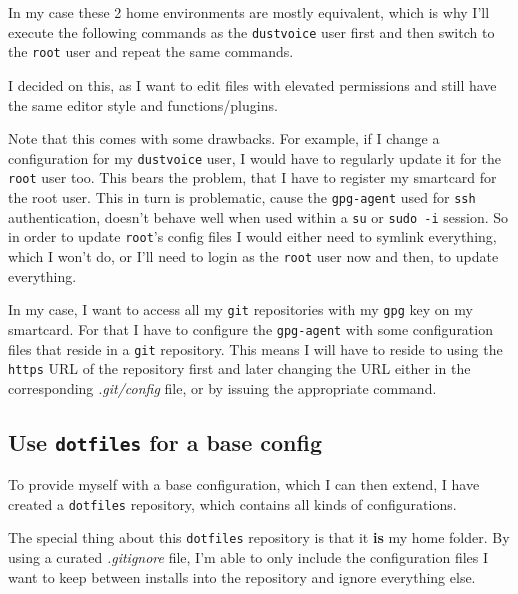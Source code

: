 \documentclass[9pt]{report}
\newenvironment{NOTE}
{\begin{tcolorbox}[colback=admonitionBG,coltitle=draculaFG,colframe=draculaBlue,colbacktitle=draculaBlue,title=NOTE]}
{\end{tcolorbox}}
\begin{document}
\begin{NOTE}
    In my case these 2 home environments are mostly equivalent, which is why I’ll execute the following commands as the \texttt{dustvoice} user first and then switch to the \texttt{root} user and repeat the same commands.


    I decided on this, as I want to edit files with elevated permissions and still have the same editor style and functions/plugins.


    Note that this comes with some drawbacks.
    For example, if I change a configuration for my \texttt{dustvoice} user, I would have to regularly update it for the \texttt{root} user too.
    This bears the problem, that I have to register my smartcard for the root user.
    This in turn is problematic, cause the \texttt{gpg-agent} used for \texttt{ssh} authentication, doesn’t behave well when used within a \texttt{su} or \texttt{sudo -i} session.
    So in order to update \texttt{root}'s config files I would either need to symlink everything, which I won’t do, or I’ll need to login as the \texttt{root} user now and then, to update everything.

\end{NOTE}
\begin{NOTE}
    In my case, I want to access all my \texttt{git} repositories with my \texttt{gpg} key on my smartcard.
    For that I have to configure the \texttt{gpg-agent} with some configuration files that reside in a \texttt{git} repository.
    This means I will have to reside to using the \texttt{https} URL of the repository first and later changing the URL either in the corresponding \textit{.git/config} file, or by issuing the appropriate command.

\end{NOTE}

\newpage

\hypertarget{x-use-dotfiles-for-a-base-config}{\subsection{Use \texttt{dotfiles} for a base config}}
To provide myself with a base configuration, which I can then extend, I have created a \texttt{dotfiles} repository, which contains all kinds of configurations.


The special thing about this \texttt{dotfiles} repository is that it \textbf{is} my home folder.
By using a curated \textit{.gitignore} file, I’m able to only include the configuration files I want to keep between installs into the repository and ignore everything else.
\end{document}
